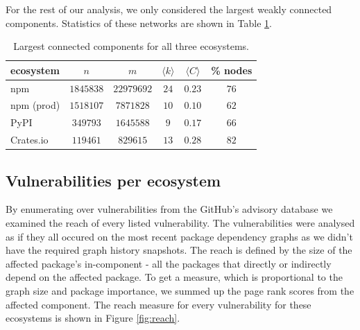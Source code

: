 \documentclass[9pt,twocolumn,twoside]{pnas-report}
\begin{document}
For the rest of our analysis, we only considered the largest weakly connected components.
Statistics of these networks are shown in Table \ref{tab:lcc_stats}.

\begin{table}[h]\centering%
	\caption{Largest connected components for all three ecosystems.}
	\begin{tabular}{l|ccccc}
		ecosystem  & $n$       & $m$        & $\langle k\rangle$ & $\langle C\rangle$ & \% nodes \\\hline
		npm        & $1845838$ & $22979692$ & $24$               & $0.23$             & $76$     \\
		npm (prod) & $1518107$ & $7871828$  & $10$               & $0.10$             & $62$     \\
		PyPI       & $349793$  & $1645588$  & $9$                & $0.17$             & $66$     \\
		Crates.io  & $119461$  & $829615$   & $13$               & $0.28$             & $82$     \\
	\end{tabular}
	\label{tab:lcc_stats}
\end{table}

\subsection*{Vulnerabilities per ecosystem}

By enumerating over vulnerabilities from the GitHub's advisory database we examined the reach of every listed vulnerability.
The vulnerabilities were analysed as if they all occured on the most recent package dependency graphs as we didn't have the required graph history snapshots.
The reach is defined by the size of the affected package's in-component - all the packages that directly or indirectly depend on the affected package.
To get a measure, which is proportional to the graph size and package importance, we summed up the page rank scores from the affected component.
The reach measure for every vulnerability for these ecosystems is shown in Figure \ref{fig:reach}.
\end{document}
